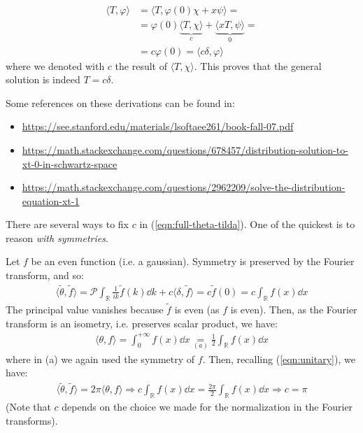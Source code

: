 \documentclass[../template.tex]{subfiles}
\begin{document}
\begin{expl}
    \begin{align*}
        \langle T, \varphi \rangle &= \langle T, \varphi(0) \chi + x \psi \rangle =\\
        &= \varphi(0) \underbrace{\langle T, \chi \rangle}_{c}  + \underbrace{\langle x T, \psi \rangle}_{0} =\\
        &= c \varphi(0) = \langle c \delta, \varphi \rangle
    \end{align*}
    where we denoted with $c$ the result of $\langle T, \chi \rangle$. This proves that the general solution is indeed $T = c \delta$.

    \medskip

    Some references on these derivations can be found in:
    \begin{itemize}
        \item \url{https://see.stanford.edu/materials/lsoftaee261/book-fall-07.pdf}
        \item \url{https://math.stackexchange.com/questions/678457/distribution-solution-to-xt-0-in-schwartz-space}
        \item \url{https://math.stackexchange.com/questions/2962209/solve-the-distribution-equation-xt-1}
    \end{itemize}
    
\end{expl}

There are several ways to fix $c$ in (\ref{eqn:full-theta-tilda}). One of the quickest is to reason \textit{with symmetries}.

Let $f$ be an even function (i.e. a gaussian). Symmetry is preserved by the Fourier transform, and so:
\begin{align}
    \langle \tilde{\theta}, \tilde{f} \rangle = \mathcal{P} \int_{\mathbb{R}} \frac{1}{ik} \tilde{f}(k) \dd{k} + c \langle \delta, \tilde{f} \rangle = c \tilde{f}(0) = c \int_{\mathbb{R}} f(x) \dd{x} \label{eqn:scalar1}
\end{align}
The principal value vanishes because $\tilde{f}$ is even (as $f$ is even). Then, as the Fourier transform is an isometry, i.e. preserves scalar product, we have:
\begin{align}
    \langle \theta, f \rangle = \int_{0}^{+\infty} f(x) \dd{x} \underset{(a)}{=}  \frac{1}{2} \int_{\mathbb{R}} f(x) \dd{x} \label{eqn:scalar2} 
\end{align}
where in (a) we again used the symmetry of $f$. Then, recalling (\ref{eqn:unitary}), we have:
\begin{align*}
    \langle \tilde{\theta}, \tilde{f} \rangle = 2\pi \langle \theta, f \rangle \Rightarrow c\int_{\mathbb{R}} f(x) \dd{x} = \frac{2 \pi}{2} \int_{\mathbb{R}} f(x) \dd{x} \Rightarrow c = \pi 
\end{align*}
(Note that $c$ depends on the choice we made for the normalization in the Fourier transforms).
\end{document}
